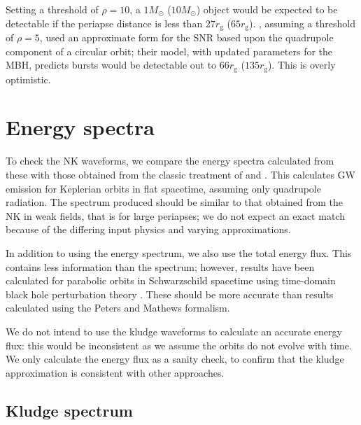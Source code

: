 \documentclass[useAMS,usedcolumn,usegraphicx,usenatbib]{mn2e}
\newcommand{\sub}[1]{\ensuremath{_\mathrm{#1}}}
\begin{document}
Setting a threshold of $\rho = 10$, a $1 M_\odot$ ($10 M_\odot$) object would be expected to be detectable if the periapse distance is less than $27 r\sub{g}$ ($65 r\sub{g}$). \citet{Hopman2007}, assuming a threshold of $\rho = 5$, used an approximate form for the SNR based upon the quadrupole component of a circular orbit; their model, with updated parameters for the MBH, predicts bursts would be detectable out to $66 r\sub{g}$ ($135 r\sub{g}$). This is overly optimistic.

\section{Energy spectra}\label{sec:Energy}

To check the NK waveforms, we compare the energy spectra calculated from these with those obtained from the classic treatment of \citet{Peters1963} and \citet{Peters1964}. This calculates GW emission for Keplerian orbits in flat spacetime, assuming only quadrupole radiation. The spectrum produced should be similar to that obtained from the NK in weak fields, that is for large periapses; we do not expect an exact match because of the differing input physics and varying approximations.

In addition to using the energy spectrum, we also use the total energy flux. This contains less information than the spectrum; however, results have been calculated for parabolic orbits in Schwarzschild spacetime using time-domain black hole perturbation theory \citep{Martel2004}. These should be more accurate than results calculated using the Peters and Mathews formalism.

We do not intend to use the kludge waveforms to calculate an accurate energy flux: this would be inconsistent as we assume the orbits do not evolve with time. We only calculate the energy flux as a sanity check, to confirm that the kludge approximation is consistent with other approaches.

\subsection{Kludge spectrum}
\end{document}
